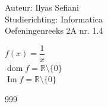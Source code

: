 \documentclass[a4paper]{article}
\begin{document}
\noindent \large Auteur: Ilyas Sefiani \\
\noindent \large Studierichting: Informatica\\
\noindent \large Oefeningenreeks 2A nr. 1.4\\

\medskip

\normalsize

$f(x) = \dfrac{1}{x}$\\

$\operatorname{dom} f = \mathbb{R}\setminus\{0\}$\\ 

$\operatorname{Im} f = \mathbb{R}\setminus\{0\}$\\ 

\begin{thebibliography}{999}
\end{thebibliography}
\end{document}
